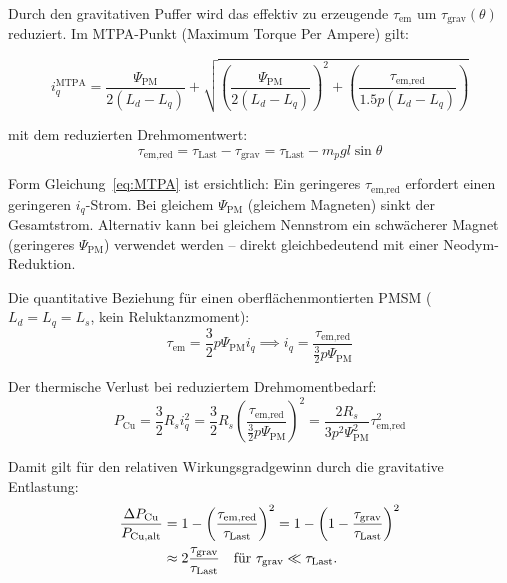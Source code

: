 ﻿\documentclass[12pt, a4paper]{report}
\theoremstyle{definition}
\theoremstyle{remark}
\begin{document}
Durch den gravitativen Puffer wird das effektiv zu erzeugende
$\tau_{\text{em}}$ um $\tau_{\text{grav}}(\theta)$ reduziert. Im MTPA-Punkt
(Maximum Torque Per Ampere) gilt:

\begin{equation}
  i_q^{\text{MTPA}} = \frac{\Psi_{\text{PM}}}{2(L_d - L_q)}
    + \sqrt{\left(\frac{\Psi_{\text{PM}}}{2(L_d-L_q)}\right)^2
           + \left(\frac{\tau_{\text{em,red}}}{1.5 p (L_d-L_q)}\right)}
  \label{eq:MTPA}
\end{equation}

mit dem reduzierten Drehmomentwert:
\begin{equation}
  \tau_{\text{em,red}} = \tau_{\text{Last}} - \tau_{\text{grav}}
  = \tau_{\text{Last}} - m_p g l \sin\theta
  \label{eq:tau_red}
\end{equation}

Form Gleichung~\eqref{eq:MTPA} ist ersichtlich: Ein geringeres
$\tau_{\text{em,red}}$ erfordert einen geringeren $i_q$-Strom. Bei
gleichem $\Psi_{\text{PM}}$ (gleichem Magneten) sinkt der Gesamtstrom.
Alternativ kann bei gleichem Nennstrom ein schwächerer Magnet (geringeres
$\Psi_{\text{PM}}$) verwendet werden -- direkt gleichbedeutend mit einer
Neodym-Reduktion.

Die quantitative Beziehung für einen oberflächenmontierten PMSM
($L_d = L_q = L_s$, kein Reluktanzmoment):
\begin{equation}
  \tau_{\text{em}} = \frac{3}{2} p \Psi_{\text{PM}} i_q
  \implies i_q = \frac{\tau_{\text{em,red}}}{\frac{3}{2} p \Psi_{\text{PM}}}
  \label{eq:iq_spmsm}
\end{equation}

Der thermische Verlust bei reduziertem Drehmomentbedarf:
\begin{equation}
  P_{\text{Cu}} = \frac{3}{2} R_s i_q^2
  = \frac{3}{2} R_s \left(\frac{\tau_{\text{em,red}}}{\frac{3}{2}p\Psi_{\text{PM}}}\right)^2
  = \frac{2 R_s}{3 p^2 \Psi_{\text{PM}}^2} \tau_{\text{em,red}}^2
  \label{eq:pcu_reduced}
\end{equation}

Damit gilt für den relativen Wirkungsgradgewinn durch die gravitative Entlastung:
\begin{align}
  \frac{\Delta P_{\text{Cu}}}{P_{\text{Cu,alt}}}
  &= 1 - \left(\frac{\tau_{\text{em,red}}}{\tau_{\text{Last}}}\right)^2
  = 1 - \left(1 - \frac{\tau_{\text{grav}}}{\tau_{\text{Last}}}\right)^2  \notag\\
  &\approx 2\frac{\tau_{\text{grav}}}{\tau_{\text{Last}}}
  \quad \text{für } \tau_{\text{grav}} \ll \tau_{\text{Last}}.
  \label{eq:delta_pcu_rel}
\end{align}
\end{document}
